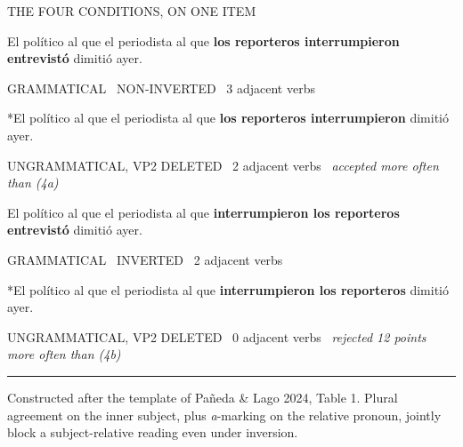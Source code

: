 \documentclass[11pt, a4paper]{article}
\begin{document}
\begin{tcolorbox}[colback=panelgray, colframe=oxblood, boxrule=0pt, leftrule=2.6pt, arc=0pt, left=14pt, right=14pt, top=10pt, bottom=10pt, breakable]
{\ttfamily\small\color{oxblood}\MakeUppercase{The four conditions, on one item}}\par
\vspace{0.8em}

\begin{xlist}
\item[(4a)] \normalfont\normalsize\upshape\color{inkgray} El político al que el periodista al que \textbf{los reporteros interrumpieron entrevistó} dimitió ayer.\par
{\footnotesize\ttfamily\color{good}GRAMMATICAL \textperiodcentered\ NON-INVERTED \textperiodcentered\ 3 adjacent verbs}

\item[(4b)] \normalfont\normalsize\upshape\color{inkgray} *El político al que el periodista al que \textbf{los reporteros interrumpieron} dimitió ayer.\par
{\footnotesize\ttfamily\color{bad}UNGRAMMATICAL, VP2 DELETED \textperiodcentered\ 2 adjacent verbs \textperiodcentered\ \normalfont\itshape accepted more often than (4a)}

\item[(4c)] \normalfont\normalsize\upshape\color{inkgray} El político al que el periodista al que \textbf{interrumpieron los reporteros entrevistó} dimitió ayer.\par
{\footnotesize\ttfamily\color{good}GRAMMATICAL \textperiodcentered\ INVERTED \textperiodcentered\ 2 adjacent verbs}

\item[(4d)] \normalfont\normalsize\upshape\color{inkgray} *El político al que el periodista al que \textbf{interrumpieron los reporteros} dimitió ayer.\par
{\footnotesize\ttfamily\color{bad}UNGRAMMATICAL, VP2 DELETED \textperiodcentered\ 0 adjacent verbs \textperiodcentered\ \normalfont\itshape rejected 12 points more often than (4b)}
\end{xlist}

\vspace{0.4em}\noindent\rule{\linewidth}{0.4pt}\par\vspace{0.6em}
{\footnotesize\ttfamily\color{midgray}Constructed after the template of Pañeda \& Lago 2024, Table 1. Plural agreement on the inner subject, plus \emph{a}-marking on the relative pronoun, jointly block a subject-relative reading even under inversion.}
\end{tcolorbox}
\end{document}
